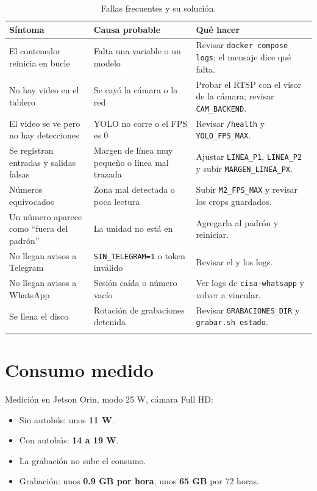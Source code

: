 \begin{longtable}{@{}L{5cm}L{4.6cm}L{4.8cm}@{}}
  \toprule
  \textbf{Síntoma} & \textbf{Causa probable} & \textbf{Qué hacer} \\
  \midrule
  \endhead
  El contenedor reinicia en bucle & Falta una variable o un modelo & Revisar
    \texttt{docker compose logs}; el mensaje dice qué falta. \\
  No hay video en el tablero & Se cayó la cámara o la red & Probar el RTSP con
    el visor de la cámara; revisar \texttt{CAM\_BACKEND}. \\
  El video se ve pero no hay detecciones & YOLO no corre o el FPS es 0 & Revisar
    \texttt{/health} y \texttt{YOLO\_FPS\_MAX}. \\
  Se registran entradas y salidas falsas & Margen de línea muy pequeño o línea
    mal trazada & Ajustar \texttt{LINEA\_P1}, \texttt{LINEA\_P2} y subir
    \texttt{MARGEN\_LINEA\_PX}. \\
  Números equivocados & Zona mal detectada o poca lectura & Subir
    \texttt{M2\_FPS\_MAX} y revisar los crops guardados. \\
  Un número aparece como ``fuera del padrón'' & La unidad no está en
     & Agregarla al padrón y reiniciar. \\
  No llegan avisos a Telegram & \texttt{SIN\_TELEGRAM=1} o token inválido &
    Revisar el  y los logs. \\
  No llegan avisos a WhatsApp & Sesión caída o número vacío & Ver logs de
    \texttt{cisa-whatsapp} y volver a vincular. \\
  Se llena el disco & Rotación de grabaciones detenida & Revisar
    \texttt{GRABACIONES\_DIR} y \texttt{grabar.sh estado}. \\
  \bottomrule
  \caption{Fallas frecuentes y su solución.}
  \label{tab:fallas}
\end{longtable}

\section{Consumo medido}

Medición en Jetson Orin, modo 25 W, cámara Full HD:

\begin{itemize}
  \item Sin autobús: unos \textbf{11 W}.
  \item Con autobús: \textbf{14 a 19 W}.
  \item La grabación no sube el consumo.
  \item Grabación: unos \textbf{0.9 GB por hora}, unos \textbf{65 GB} por 72
        horas.
\end{itemize}

